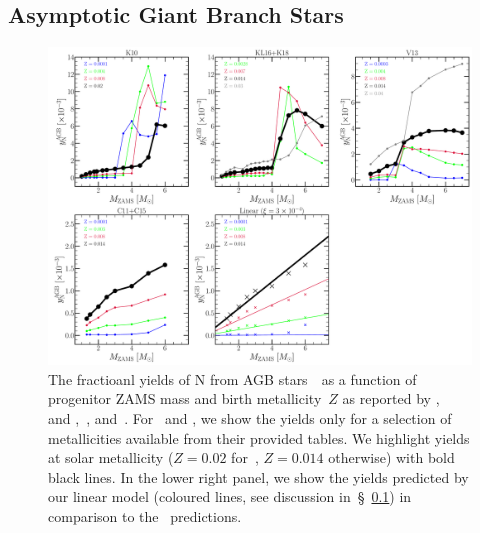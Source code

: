 \documentclass[ms.tex]{subfiles}
\begin{document}
\subsection{Asymptotic Giant Branch Stars}
\label{sec:yields:agb}

\begin{figure}
\centering
\includegraphics[scale = 0.32]{agb_yield_models.pdf}
\caption{
The fractioanl yields of N from AGB stars~~as a function of progenitor
ZAMS mass and birth metallicity~$Z$ as reported by
\citet[][upper left]{Karakas2010},~\citet{Karakas2016} and
\citet[][upper middle]{Karakas2018},~\citet[][upper right]{Ventura2013,
Ventura2014, Ventura2018, Ventura2020}, and~\citet[][lower right]{Cristallo2011,
Cristallo2015}.
For~\citet{Ventura2013, Ventura2014, Ventura2018, Ventura2020} and
\citet{Cristallo2011, Cristallo2015}, we show the yields only for a selection
of metallicities available from their provided tables.
We highlight yields at solar metallicity ($Z = 0.02$ for~\citealp{Karakas2010},
$Z = 0.014$ otherwise) with bold black lines.
In the lower right panel, we show the yields predicted by our linear model
(coloured lines, see discussion in~\S~\ref{sec:yields:agb}) in comparison to
the~\citet[][coloured X's]{Cristallo2011, Cristallo2015} predictions.
}
\label{fig:agb_yield_models}
\end{figure}
\end{document}
